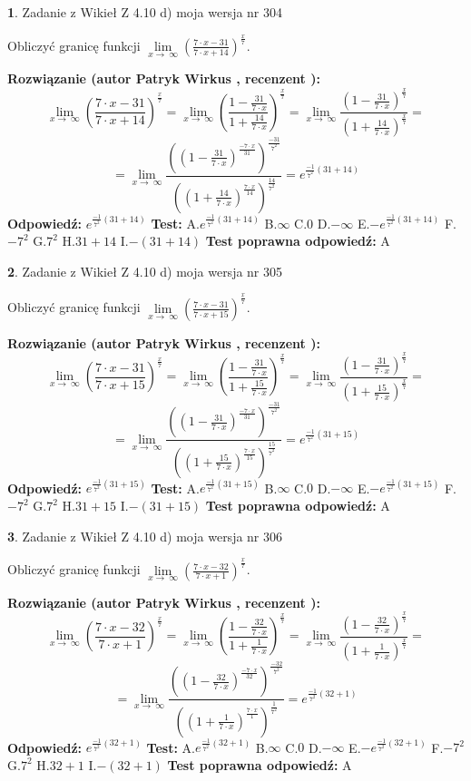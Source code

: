 \documentclass[12pt, a4paper]{article}
\theoremstyle{definition} %
\newtheorem{zad}{}
\newcommand{\zadStart}[1]{\begin{zad}#1\newline}
\newcommand{\zadStop}{\end{zad}}
\newcommand{\rozwStart}[2]{\noindent \textbf{Rozwiązanie (autor #1 , recenzent #2): }\newline}
\newcommand{\rozwStop}{\newline}
\newcommand{\odpStart}{\noindent \textbf{Odpowiedź:}\newline}
\newcommand{\odpStop}{\newline}
\newcommand{\testStart}{\noindent \textbf{Test:}\newline}
\newcommand{\testStop}{\newline}
\newcommand{\kluczStart}{\noindent \textbf{Test poprawna odpowiedź:}\newline}
\newcommand{\kluczStop}{\newline}
\begin{document}
\zadStart{Zadanie z Wikieł Z 4.10 d) moja wersja nr 304}


Obliczyć granicę funkcji  $\lim\limits_{x\to\ \infty}(\frac{7\cdot x-31}{7\cdot x+14})^{\frac{x}{7}}$.
\zadStop
\rozwStart{Patryk Wirkus}{}
$$\lim\limits_{x\to\ \infty}(\frac{7\cdot x-31}{7\cdot x+14})^{\frac{x}{7}} = \lim\limits_{x\to\ \infty}(\frac{1-\frac{31}{7\cdot x}}{1+\frac{14}{7\cdot x}})^{\frac{x}{7}}=\lim\limits_{x\to\ \infty}\frac{(1-\frac{31}{7\cdot x})^{\frac{x}{7}}}{(1+\frac{14}{7\cdot x})^{\frac{x}{7}}}=$$
$$=\lim\limits_{x\to\ \infty}\frac{((1-\frac{31}{7\cdot x})^{\frac{-7\cdot x}{31}})^{\frac{-31}{7^{2}}}}{((1+\frac{14}{7\cdot x})^{\frac{7\cdot x}{14}})^{\frac{14}{7^{2}}}}=e^{\frac{-1}{7^{2}}(31+14)}$$
\rozwStop
\odpStart
$e^{\frac{-1}{7^{2}}(31+14)}$
\odpStop
\testStart
A.$e^{\frac{-1}{7^{2}}(31+14)}$ B.$\infty$ C.$0$ D.$-\infty$ E.$-e^{\frac{-1}{7^{2}}(31+14)}$
F.$-7^{2}$ G.$7^{2}$
H.$31+14$
I.$-(31+14)$
\testStop
\kluczStart
A
\kluczStop



\zadStart{Zadanie z Wikieł Z 4.10 d) moja wersja nr 305}


Obliczyć granicę funkcji  $\lim\limits_{x\to\ \infty}(\frac{7\cdot x-31}{7\cdot x+15})^{\frac{x}{7}}$.
\zadStop
\rozwStart{Patryk Wirkus}{}
$$\lim\limits_{x\to\ \infty}(\frac{7\cdot x-31}{7\cdot x+15})^{\frac{x}{7}} = \lim\limits_{x\to\ \infty}(\frac{1-\frac{31}{7\cdot x}}{1+\frac{15}{7\cdot x}})^{\frac{x}{7}}=\lim\limits_{x\to\ \infty}\frac{(1-\frac{31}{7\cdot x})^{\frac{x}{7}}}{(1+\frac{15}{7\cdot x})^{\frac{x}{7}}}=$$
$$=\lim\limits_{x\to\ \infty}\frac{((1-\frac{31}{7\cdot x})^{\frac{-7\cdot x}{31}})^{\frac{-31}{7^{2}}}}{((1+\frac{15}{7\cdot x})^{\frac{7\cdot x}{15}})^{\frac{15}{7^{2}}}}=e^{\frac{-1}{7^{2}}(31+15)}$$
\rozwStop
\odpStart
$e^{\frac{-1}{7^{2}}(31+15)}$
\odpStop
\testStart
A.$e^{\frac{-1}{7^{2}}(31+15)}$ B.$\infty$ C.$0$ D.$-\infty$ E.$-e^{\frac{-1}{7^{2}}(31+15)}$
F.$-7^{2}$ G.$7^{2}$
H.$31+15$
I.$-(31+15)$
\testStop
\kluczStart
A
\kluczStop



\zadStart{Zadanie z Wikieł Z 4.10 d) moja wersja nr 306}


Obliczyć granicę funkcji  $\lim\limits_{x\to\ \infty}(\frac{7\cdot x-32}{7\cdot x+1})^{\frac{x}{7}}$.
\zadStop
\rozwStart{Patryk Wirkus}{}
$$\lim\limits_{x\to\ \infty}(\frac{7\cdot x-32}{7\cdot x+1})^{\frac{x}{7}} = \lim\limits_{x\to\ \infty}(\frac{1-\frac{32}{7\cdot x}}{1+\frac{1}{7\cdot x}})^{\frac{x}{7}}=\lim\limits_{x\to\ \infty}\frac{(1-\frac{32}{7\cdot x})^{\frac{x}{7}}}{(1+\frac{1}{7\cdot x})^{\frac{x}{7}}}=$$
$$=\lim\limits_{x\to\ \infty}\frac{((1-\frac{32}{7\cdot x})^{\frac{-7\cdot x}{32}})^{\frac{-32}{7^{2}}}}{((1+\frac{1}{7\cdot x})^{\frac{7\cdot x}{1}})^{\frac{1}{7^{2}}}}=e^{\frac{-1}{7^{2}}(32+1)}$$
\rozwStop
\odpStart
$e^{\frac{-1}{7^{2}}(32+1)}$
\odpStop
\testStart
A.$e^{\frac{-1}{7^{2}}(32+1)}$ B.$\infty$ C.$0$ D.$-\infty$ E.$-e^{\frac{-1}{7^{2}}(32+1)}$
F.$-7^{2}$ G.$7^{2}$
H.$32+1$
I.$-(32+1)$
\testStop
\kluczStart
A
\kluczStop
\end{document}
